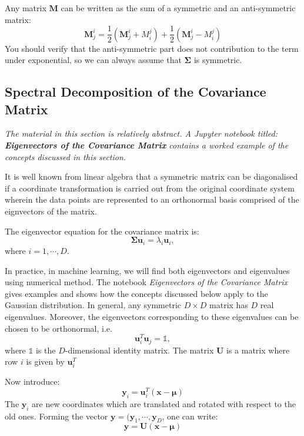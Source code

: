   Any matrix $\boldsymbol{M}$ can be written as the sum of a symmetric and an anti-symmetric matrix:
  $$
  \boldsymbol{M}^i_j = \frac{1}{2}(\boldsymbol{M}^i_j + M^j_i) + \frac{1}{2}(\boldsymbol{M}^i_j - M^j_i)
  $$
  You should verify that the anti-symmetric part does not contribution to the term under exponential, so we can always assume that $\boldsymbol{\Sigma}$ is symmetric.

  
  
  \subsection{Spectral Decomposition of the Covariance Matrix}
  \emph{The material in this section is relatively abstract. A Jupyter notebook titled: {\bf Eigenvectors of the Covariance Matrix} contains
    a worked example of the concepts discussed in this section.}
  
  It is well known from linear algebra that a symmetric matrix can be diagonalised if a coordinate transformation is carried out from the original
  coordinate system wherein the data points are represented to an orthonormal basis comprised of the eignvectors of the matrix.

  
  The eigenvector equation
  for the covariance matrix is:
  $$
  \boldsymbol{\Sigma}\boldsymbol{u}_i = \lambda_i \boldsymbol{u}_i,
  $$
  where $i = 1, \cdots, D$.

  In practice, in machine learning, we will find both eigenvectors and eigenvalues using numerical method. The notebook \emph{Eigenvectors of the Covariance Matrix}
  gives examples and shows how the concepts discussed below apply to the Gaussian distribution.
  In general, any symmetric $D \times D$ matrix has $D$ real eigenvalues. Moreover, the eigenvectors corresponding to these eigenvalues can be chosen to be orthonormal, i.e.
  \begin{equation}
    \boldsymbol{u}^T_i\boldsymbol{u}_j = \mathbb{1},
  \end{equation}
  where $\mathbb{1}$ is the $D$-dimensional identity matrix.
  The matrix $\boldsymbol{U}$ is a matrix where row $i$ is given by $\boldsymbol{u}^T_i$

  Now introduce:  
  $$
  \boldsymbol{y}_i = \boldsymbol{u}^T_i(\boldsymbol{x} - \boldsymbol{\mu})
  $$
  The $\boldsymbol{y}_i$ are new coordinates which are translated and rotated with respect to the old ones. Forming the vector
  $\boldsymbol{y} = (\boldsymbol{y}_1, \cdots, \boldsymbol{y}_D$, one can write:
  $$
  \boldsymbol{y} = \boldsymbol{U}(\boldsymbol{x} - \boldsymbol{\mu} )
  $$


